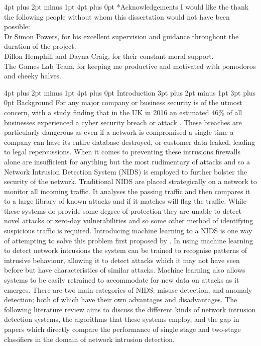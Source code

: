 \documentclass[12pt,a4paper]{article}
\makeatletter
\renewcommand\subsection{\@startsection {subsection}{1}{2mm} %
      {3pt plus 2pt minus 1pt} %
      {3pt plus 0pt} %
      {\normalfont\bfseries}}
\renewcommand\section{\@startsection {section}{1}{0mm} %
      {4pt plus 2pt minus 1pt} %
      {4pt plus 0pt} %
      {\bfseries}}
\makeatother
\begin{document}
\section*{Acknowledgements}
\noindent I would like the thank the following people without whom this dissertation would not have been possible: \\

\noindent Dr Simon Powers, for his excellent supervision and guidance throughout the duration of the project. \\

\noindent Dillon Hemphill and Dayna Craig, for their constant moral support. \\

\noindent The Games Lab Team, for keeping me productive and motivated with pomodoros and cheeky halves.



\newpage

\section{Introduction}
\subsection{Background}
	For any major company or business security is of the utmost concern, with a study finding that in the UK in 2016 an estimated 46\% of all businesses experienced a cyber security breach or attack \parencite{securitysurvey2017}. These breaches are particularly dangerous as even if a network is compromised a single time a company can have its entire database destroyed, or customer data leaked, leading to legal repercussions. When it comes to preventing these intrusions firewalls alone are insufficient for anything but the most rudimentary of attacks and so a Network Intrusion Detection System (NIDS) is employed to further bolster the security of the network. Traditional NIDS are placed strategically on a network to monitor all incoming traffic. It analyses the passing traffic and then compares it to a large library of known attacks and if it matches will flag the traffic. While these systems do provide some degree of protection they are unable to detect novel attacks or zero-day vulnerabilities and so some other method of identifying suspicious traffic is required. Introducing machine learning to a NIDS is one way of attempting to solve this problem first proposed by \cite{denning1987intrusion}. In using machine learning to detect network intrusions the system can be trained to recognise patterns of intrusive behaviour, allowing it to detect attacks which it may not have seen before but have characteristics of similar attacks. Machine learning also allows systems to be easily retrained to accommodate for new data on attacks as it emerges. There are two main categories of NIDS: misuse detection, and anomaly detection; both of which have their own advantages and disadvantages. The following literature review aims to discuss the different kinds of network intrusion detection systems, the algorithms that these systems employ, and the gap in papers which directly compare the performance of single stage and two-stage classifiers in the domain of network intrusion detection.
		
\end{document}
